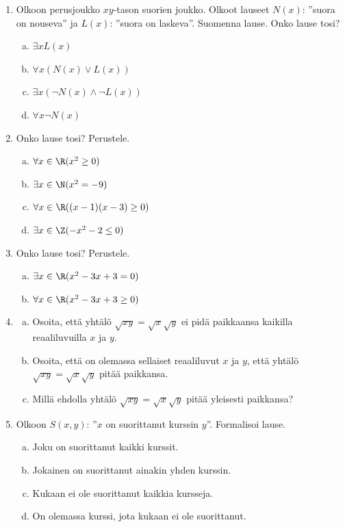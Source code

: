 \begin{enumerate}

\item Olkoon perusjoukko $xy$-tason suorien joukko. Olkoot
lauseet $N(x)$: ''suora on nouseva'' ja $L(x)$: ''suora on laskeva''.
Suomenna lause. Onko lause tosi?
\begin{enumerate}[a)]
\item $\exists x L(x)$
\item $\forall x (N(x) \lor L(x))$
\item $\exists x (\lnot N(x) \land \lnot L(x))$
\item $\forall x \lnot N(x)$
\end{enumerate}

\item Onko lause tosi? Perustele.
\begin{enumerate}[a)]
\item $\forall x\in\R (x^2 \ge 0)$
\item $\exists x\in\N (x^2 = -9)$
\item $\forall x\in\R ((x-1)(x-3) \ge 0)$
\item $\exists x\in\Z (-x^2 - 2 \le 0)$
\end{enumerate}

\item Onko lause tosi? Perustele.
\begin{enumerate}[a)]
\item $\exists x\in \R (x^2 - 3x + 3 = 0)$
\item $\forall x\in \R (x^2 - 3x + 3 \ge 0)$
\end{enumerate}

\item
\begin{enumerate}[a)]
\item Osoita, että yhtälö $\sqrt{xy} = \sqrt{x}\sqrt{y}$ ei
pidä paikkaansa kaikilla reaaliluvuilla $x$ ja $y$.
\item Osoita, että on olemassa sellaiset reaaliluvut $x$ ja
$y$, että yhtälö $\sqrt{xy} = \sqrt{x}\sqrt{y}$ pitää paikkansa.
\item Millä ehdolla yhtälö $\sqrt{xy} = \sqrt{x}\sqrt{y}$
pitää yleisesti paikkansa?
\end{enumerate}

\item Olkoon $S(x, y)$: ''$x$ on suorittanut kurssin $y$''.
Formalisoi lause.
\begin{enumerate}[a)]
\item Joku on suorittanut kaikki kurssit.
\item Jokainen on suorittanut ainakin yhden kurssin.
\item Kukaan ei ole suorittanut kaikkia kursseja.
\item On olemassa kurssi, jota kukaan ei ole suorittanut.
\end{enumerate}


\end{enumerate}
